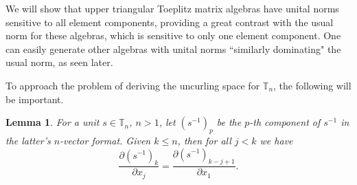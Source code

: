 \documentclass{amsart}
\numberwithin{equation}{section}
\newtheorem{lemma}[theorem]{Lemma}
\theoremstyle{definition}
\numberwithin{theorem}{section}
\begin{document}
We will show that upper triangular Toeplitz matrix algebras have unital norms sensitive to all element components, providing a great contrast with the usual norm for these algebras, which is sensitive to only one element component.  One can easily generate other algebras with unital norms ``similarly dominating" the usual norm, as seen later.

To approach the problem of deriving the uncurling space for $\mathbb{T}_n$, the following will be important.

\begin{lemma} \label{5/7/22.15} For a unit $s\in \mathbb{T}_n$,  $n>1$, let $\left( s^{-1} \right)_p$ be the $p$-th component of $s^{-1}$ in the latter's $n$-vector format.  Given $k\le n$, then for all $j<k$ we have \begin{equation}\label{5/6/22.10} \frac{\partial \left( s^{-1} \right)_k}{\partial x_j} = \frac{\partial \left( s^{-1} \right)_{k-j+1}}{\partial x_1}.\end{equation}
\end{lemma}
\end{document}
